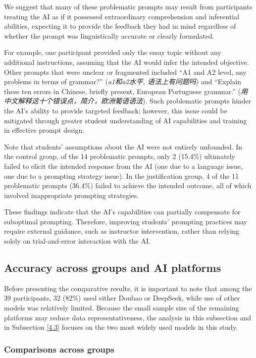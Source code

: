 \documentclass[english]{textolivre}
\begin{document}
We suggest that many of these problematic prompts may result from participants treating the AI as if it possessed extraordinary comprehension and inferential abilities, expecting it to provide the feedback they had in mind regardless of whether the prompt was linguistically accurate or clearly formulated.

For example, one participant provided only the essay topic without any additional instructions, assuming that the AI would infer the intended objective. Other prompts that were unclear or fragmented included ``A1 and A2 level, any problems in terms of grammar?'' (\emph{a1和a2水平, 语法上有问题吗}) and ``Explain these ten errors in Chinese, briefly present, European Portuguese grammar.'' (\emph{用中文解释这十个错误点，简介，欧洲葡语语法}). Such problematic prompts hinder the AI's ability to provide targeted feedback; however, this issue could be mitigated through greater student understanding of AI capabilities and training in effective prompt design.


Note that students' assumptions about the AI were not entirely unfounded. In the control group, of the 14 problematic prompts, only 2 (15.4\%) ultimately failed to elicit the intended response from the AI (one due to a language issue, one due to a prompting strategy issue). In the justification group, 4 of the 11 problematic prompts (36.4\%) failed to achieve the intended outcome, all of which involved inappropriate prompting strategies.

These findings indicate that the AI's capabilities can partially compensate for suboptimal prompting. Therefore, improving students’ prompting practices may require external guidance, such as instructor intervention, rather than relying solely on trial-and-error interaction with the AI.

\subsection{Accuracy across groups and AI platforms}

Before presenting the comparative results, it is important to note that among the 39 participants, 32 (82\%) used either Doubao or DeepSeek, while use of other models was relatively limited. Because the small sample size of the remaining platforms may reduce data representativeness, the analysis in this subsection and in Subsection \ref{4.3} focuses on the two most widely used models in this study. 

\subsubsection{Comparisons across groups}
\end{document}
